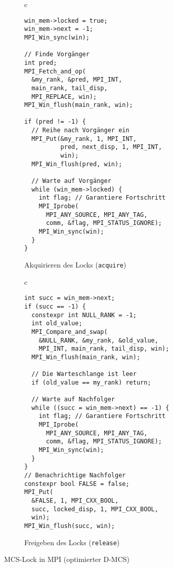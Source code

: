 \begin{figure}[h]
    \begin{subfigure}[b]{.5\textwidth}
        \centering
        \begin{tabular}{c}\begin{lstlisting}
win_mem->locked = true;
win_mem->next = -1;
MPI_Win_sync(win);

// Finde Vorgänger
int pred;
MPI_Fetch_and_op(
  &my_rank, &pred, MPI_INT,
  main_rank, tail_disp,
  MPI_REPLACE, win);
MPI_Win_flush(main_rank, win);

if (pred != -1) {
  // Reihe nach Vorgänger ein
  MPI_Put(&my_rank, 1, MPI_INT,
          pred, next_disp, 1, MPI_INT,
          win);
  MPI_Win_flush(pred, win);

  // Warte auf Vorgänger
  while (win_mem->locked) {
    int flag; // Garantiere Fortschritt
    MPI_Iprobe(
      MPI_ANY_SOURCE, MPI_ANY_TAG,
      comm, &flag, MPI_STATUS_IGNORE);
    MPI_Win_sync(win);
  }
}
        \end{lstlisting}\end{tabular}
        \caption{Akquirieren des Locks (\texttt{acquire})}
        \label{fig:mcs_mpi_acquire}
    \end{subfigure}
    \begin{subfigure}[b]{.5\textwidth}
        \centering
        \begin{tabular}{c}\begin{lstlisting}
int succ = win_mem->next;
if (succ == -1) {
  constexpr int NULL_RANK = -1;
  int old_value;
  MPI_Compare_and_swap(
    &NULL_RANK, &my_rank, &old_value,
    MPI_INT, main_rank, tail_disp, win);
  MPI_Win_flush(main_rank, win);

  // Die Warteschlange ist leer
  if (old_value == my_rank) return;

  // Warte auf Nachfolger
  while ((succ = win_mem->next) == -1) {
    int flag; // Garantiere Fortschritt
    MPI_Iprobe(
      MPI_ANY_SOURCE, MPI_ANY_TAG,
      comm, &flag, MPI_STATUS_IGNORE);
    MPI_Win_sync(win);
  }
}
// Benachrichtige Nachfolger
constexpr bool FALSE = false;
MPI_Put(
  &FALSE, 1, MPI_CXX_BOOL,
  succ, locked_disp, 1, MPI_CXX_BOOL,
  win);
MPI_Win_flush(succ, win);
        \end{lstlisting}\end{tabular}
        \caption{Freigeben des Locks (\texttt{release})}
        \label{fig:mcs_mpi_release}
    \end{subfigure}
    \caption{MCS-Lock in MPI (optimierter D-MCS)}
    \label{fig:mcs_mpi_code}
\end{figure}

